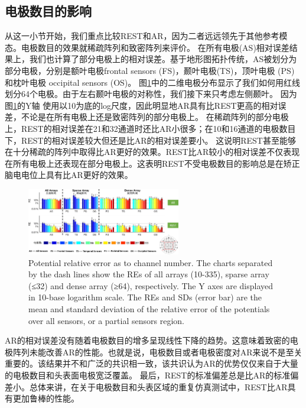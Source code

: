 \subsection{电极数目的影响}
从这一小节开始，我们重点比较REST和AR，因为二者远远领先于其他参考模态。电极数目的效果就稀疏阵列和致密阵列来评价。 在所有电极(AS)相对误差结果上，我们也计算了部分电极上的相对误差。基于地形图拓扑传统，AS被划分为部分电极，分别是额叶电极frontal sensors
(FS)，颞叶电极(TS)，顶叶电极 (PS) 和枕叶电极 occipital sensors (OS)。 图\ref{2.4}中的二维电极分布显示了我们如何用红线划分64个电极。由于左右颞叶电极的对称性，我们接下来只考虑左侧颞叶。 因为图\ref{2.4}的Y轴
使用以10为底的log尺度，因此明显地AR具有比REST更高的相对误差，不论是在所有电极上还是致密阵列的部分电极上。 在稀疏阵列的部分电极上，REST的相对误差在21和32通道时还比AR小很多；在10和16通道的电极数目下，REST的相对误差较大但还是比AR的相对误差要小。 这说明REST甚至能够在十分稀疏的阵列中取得比AR更好的效果。REST比AR较小的相对误差不仅表现在所有电极上还表现在部分电极上。这表明REST不受电极数目的影响总是在矫正脑电电位上具有比AR更好的效果。
\begin{figure}[h!]
	\centering
	\includegraphics[width=0.6\textwidth,natwidth=610,natheight=642]{pic/JNE/figure4.png}
	\caption{Potential relative error as to channel number. The charts separated by the dash lines show the REs of all arrays (10-335), sparse array (≤32) and dense array (≥64), respectively. The Y axes are displayed in 10-base logarithm scale. The REs and SDs (error bar) are the mean and standard deviation of the relative error of the potentials over all sensors, or a partial sensors region.}
	\label{2.4}
\end{figure}
AR的相对误差没有随着电极数目的增多呈现线性下降的趋势。这意味着致密的电极阵列未能改善AR的性能。也就是说，电极数目或者电极密度对AR来说不是至关重要的。该结果并不和广泛的共识相一致，该共识认为AR的优势仅仅来自于大量的电极数目和头表面电极宽泛覆盖。
最后，REST的标准偏差总是比AR的标准偏差小。总体来讲，在关于电极数目和头表区域的重复仿真测试中，REST比AR具有更加鲁棒的性能。

